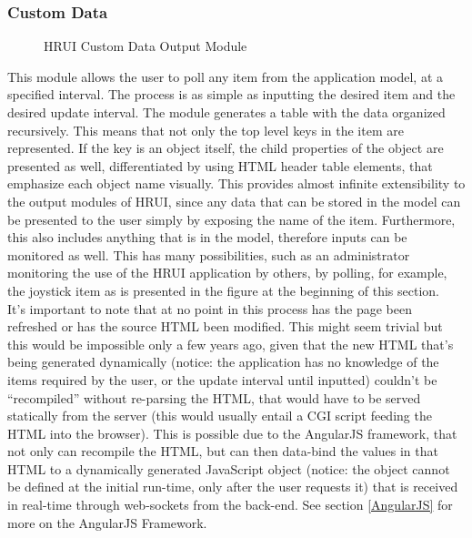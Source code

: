 \subsubsection{Custom Data} \label{customdata}
\begin{figure}[H]
\centering
\captionsetup{justification=centering}
\caption{HRUI Custom Data Output Module}
\end{figure}
This module allows the user to poll any item from the application model, at a specified interval. The process is as simple as 
inputting the desired item and the desired update interval. The module generates a table with the data organized recursively. 
This means that not only the top level keys in the item are represented. If the key is an object itself, the child properties 
of the object are presented as well, differentiated by using HTML header table elements, that emphasize each object name 
visually. This provides almost infinite extensibility to the output modules of HRUI, since any data that can be stored in the 
model can be presented to the user simply by exposing the name of the item. Furthermore, this also includes anything that is 
in the model, therefore inputs can be monitored as well. This has many possibilities, such as an administrator monitoring the 
use of the HRUI application by others, by polling, for example, the joystick item as is presented in the figure at the 
beginning of this section.\\

It's important to note that at no point in this process has the page been refreshed or has the source HTML been modified. 
This might seem trivial but this would be impossible only a few years ago, given that the new HTML that's being generated 
dynamically (notice: the application has no knowledge of the items required by the user, or the update interval until 
inputted) couldn't be ``recompiled'' without re-parsing the HTML, that would have to be served statically from the server 
(this would usually entail a CGI script feeding the HTML into the browser). This is possible due to the AngularJS framework, 
that not only can recompile the HTML, but can then data-bind the values in that HTML to a dynamically generated JavaScript 
object (notice: the object cannot be defined at the initial run-time, only after the user requests it) that is received in 
real-time through web-sockets from the back-end. See section \ref{AngularJS} for more on the AngularJS Framework.
